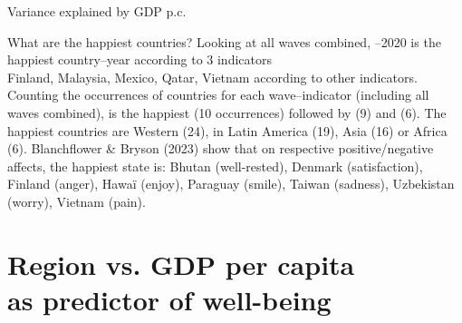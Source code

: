 \documentclass[aspectratio=169,xcolor=dvipsnames, 11pt,mathserif]{beamer}
\begin{document}
\begin{frame}{Variance explained by GDP p.c.\label{gdp} \hyperlink{gdp_add}{}}
\end{frame}

\begin{frame}{What are the happiest countries?}
    \bbvsp
    \ip {}
    \ip Looking at all waves combined, --2020 is the happiest country--year according to 3 indicators\\Finland, Malaysia, Mexico, Qatar, Vietnam according to other indicators.
    \ip Counting the occurrences of countries for each wave--indicator (including all waves combined),  is the happiest (10 occurrences) followed by  (9) and  (6).
    \ip The happiest countries are Western (24), in Latin America (19), Asia (16) or Africa (6).
    \ip Blanchflower \& Bryson (2023) show that on respective positive/negative affects, the happiest state is: Bhutan (well-rested), Denmark (satisfaction), Finland (anger), Hawaï (enjoy), Paraguay (smile), Taiwan (sadness), Uzbekistan (worry), Vietnam (pain). %
    \ee
\end{frame}


\section{Region vs. GDP per capita\\as predictor of well-being}
\end{document}
